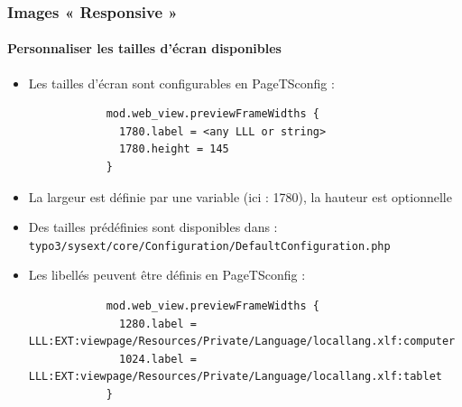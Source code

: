 
\begin{frame}[fragile]
	\frametitle{Images « Responsive »}
	\framesubtitle{Personnaliser les tailles d'écran disponibles}

	\begin{itemize}
		\item Les tailles d'écran sont configurables en PageTSconfig :


		\begin{lstlisting}
			mod.web_view.previewFrameWidths {
			  1780.label = <any LLL or string>
			  1780.height = 145
			}
		\end{lstlisting}

		\item La largeur est définie par une variable (ici : 1780), la hauteur est optionnelle
		\item Des tailles prédéfinies sont disponibles dans :\newline
			\small\texttt{typo3/sysext/core/Configuration/DefaultConfiguration.php}\normalsize
		\item Les libellés peuvent être définis en PageTSconfig :

		\begin{lstlisting}
			mod.web_view.previewFrameWidths {
			  1280.label = LLL:EXT:viewpage/Resources/Private/Language/locallang.xlf:computer
			  1024.label = LLL:EXT:viewpage/Resources/Private/Language/locallang.xlf:tablet
			}
		\end{lstlisting}

	\end{itemize}

\end{frame}


